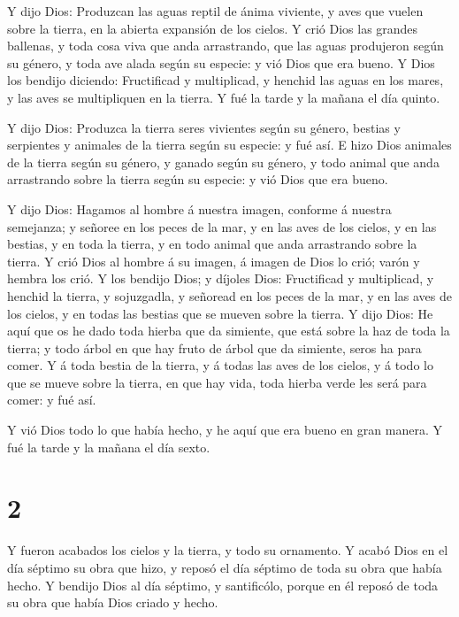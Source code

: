  Y dijo Dios: Produzcan las aguas reptil de ánima viviente,
y aves que vuelen sobre la tierra, en la abierta expansión de los
cielos.  Y crió Dios las grandes ballenas, y toda cosa viva
que anda arrastrando, que las aguas produjeron según su género, y toda
ave alada según su especie: y vió Dios que era bueno.  Y
Dios los bendijo diciendo: Fructificad y multiplicad, y henchid las
aguas en los mares, y las aves se multipliquen en la tierra.
 Y fué la tarde y la mañana el día quinto.

 Y dijo Dios: Produzca la tierra seres vivientes según su
género, bestias y serpientes y animales de la tierra según su especie: y
fué así.  E hizo Dios animales de la tierra según su
género, y ganado según su género, y todo animal que anda arrastrando
sobre la tierra según su especie: y vió Dios que era bueno.

 Y dijo Dios: Hagamos al hombre á nuestra imagen, conforme
á nuestra semejanza; y señoree en los peces de la mar, y en las aves de
los cielos, y en las bestias, y en toda la tierra, y en todo animal que
anda arrastrando sobre la tierra.  Y crió Dios al hombre á
su imagen, á imagen de Dios lo crió; varón y hembra los crió.
 Y los bendijo Dios; y díjoles Dios: Fructificad y
multiplicad, y henchid la tierra, y sojuzgadla, y señoread en los peces
de la mar, y en las aves de los cielos, y en todas las bestias que se
mueven sobre la tierra.  Y dijo Dios: He aquí que os he
dado toda hierba que da simiente, que está sobre la haz de toda la
tierra; y todo árbol en que hay fruto de árbol que da simiente, seros ha
para comer.  Y á toda bestia de la tierra, y á todas las
aves de los cielos, y á todo lo que se mueve sobre la tierra, en que hay
vida, toda hierba verde les será para comer: y fué así.

 Y vió Dios todo lo que había hecho, y he aquí que era
bueno en gran manera. Y fué la tarde y la mañana el día sexto.

\hypertarget{section-1}{%
\section{2}\label{section-1}}

 Y fueron acabados los cielos y la tierra, y todo su
ornamento.  Y acabó Dios en el día séptimo su obra que hizo,
y reposó el día séptimo de toda su obra que había hecho.  Y
bendijo Dios al día séptimo, y santificólo, porque en él reposó de toda
su obra que había Dios criado y hecho.

